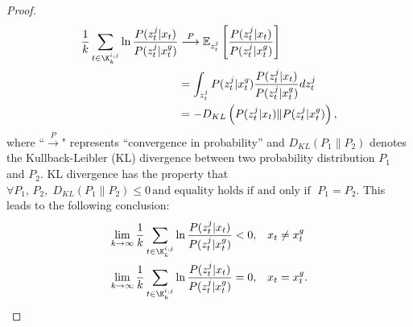 \begin{proof}
		\small\begin{subequations}\label{eqn:cmp_lim2}
			\begin{align}
			\frac{1}{k}\sum\limits_{t\in\K^{i,j}_{k}}\ln\frac{P(z^j_t|x_t)}{P(z^j_t|x^g_t)}&\overset{P}{\longrightarrow}\mathbb{E}_{z^j_t} \left[\frac{P(z^j_t|x_t)}{P(z^j_t|x^g_t)}\right]\\
			&=\int_{z^j_t} P(z^j_t|x^g_t)\frac{P(z^j_t|x_t)}{P(z^j_t|x^g_t)} dz^j_t\\
			&=-D_{KL}\left(P(z^j_t|x_t)\|P(z^j_t|x^g_t)\right),
			\end{align}
		\end{subequations}\normalsize		
		where ``$\overset{P}{\longrightarrow}$" represents ``convergence in probability'' and $D_{KL}(P_1\|P_2)$ denotes the Kullback-Leibler (KL) divergence between two probability distribution $P_1$ and $P_2$.
		KL divergence has the property that $\forall P_1,\,P_2, \; D_{KL}(P_1\|P_2)\leq 0\, \text{and equality holds if and only if } \; P_1=P_2.$
		This leads to the following conclusion:
			\small\begin{align*}
			\lim\limits_{k\rightarrow \infty}\frac{1}{k}\sum\limits_{t\in\K^{i,j}_{k}}\ln\frac{P(z^j_t|x_t)}{P(z^j_t|x^g_t)}<0,&\quad x_t\neq x^g_t\\
			\lim\limits_{k\rightarrow \infty}\frac{1}{k}\sum\limits_{t\in\K^{i,j}_{k}}\ln\frac{P(z^j_t|x_t)}{P(z^j_t|x^g_t)}=0,&\quad x_t= x^g_t.
			\end{align*}\normalsize
		

\end{proof}
